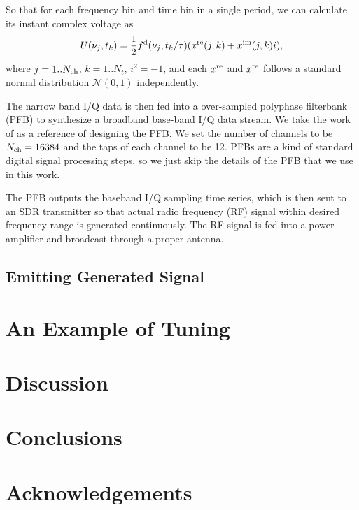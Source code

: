 \documentclass[fleqn,usenatbib]{mnras}
\begin{document}
So that for each frequency bin and time bin in a single period, we can calculate its instant complex voltage as
\begin{gather}
    U(\nu_{j}, t_{k})=\frac{1}{2}f^{\rm d}(\nu_j, t_{k}/\tau)(x^{\rm re}(j,k)+x^{\rm im}(j,k)i),
\end{gather}
where $j=1..N_{\rm ch}$, $k=1..N_{t}$, $i^2=-1$, and each $x^{\rm re}$ and $x^{\rm re}$ follows a standard normal distribution $\mathcal{N}(0,1)$ independently.

The narrow band I/Q data is then fed into a over-sampled polyphase filterbank (PFB) to synthesize a broadband base-band I/Q data stream.
We take the work of \citet{2020JAI.....950004M} as a reference of designing the PFB.
We set the number of channels to be $N_{\rm ch}=16384$ and the taps of each channel to be 12.
PFBs are a kind of standard digital signal processing steps, so we just skip the details of the PFB that we use in this work.

The PFB outputs the baseband I/Q sampling time series, which is then sent to an SDR transmitter so that actual radio frequency (RF) signal within desired frequency range is generated continuously.
The RF signal is fed into a power amplifier and broadcast through a proper antenna. 

\subsection{Emitting Generated Signal}

\section{An Example of Tuning}

\section{Discussion}

\section{Conclusions}

\section*{Acknowledgements}








\bsp	%
\label{lastpage}
\end{document}
